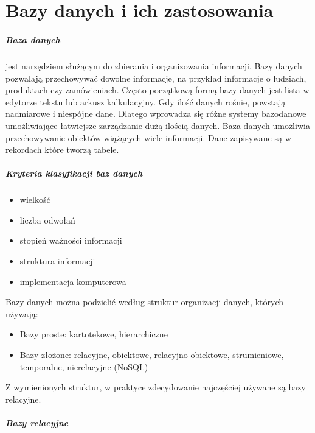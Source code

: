 \documentclass[]{report}
\begin{document}
\chapter{Bazy danych i ich zastosowania}

\paragraph{Baza danych} jest narzędziem służącym do zbierania i organizowania informacji. Bazy danych pozwalają przechowywać dowolne informacje, na przykład informacje o ludziach, produktach czy zamówieniach. Często początkową formą bazy danych jest lista w edytorze tekstu lub arkusz kalkulacyjny. Gdy ilość danych rośnie, powstają nadmiarowe i niespójne dane. Dlatego wprowadza się różne systemy bazodanowe umożliwiające łatwiejsze zarządzanie dużą ilością danych. Baza danych umożliwia przechowywanie obiektów wiążących wiele informacji. Dane zapisywane są w rekordach które tworzą tabele.

\medskip 

\paragraph{Kryteria klasyfikacji baz danych}

\begin{itemize}
\item wielkość
\item liczba odwołań
\item stopień ważności informacji
\item struktura informacji
\item implementacja komputerowa
\end{itemize}

Bazy danych można podzielić według struktur organizacji danych, których używają:

\begin{itemize}
\item Bazy proste: kartotekowe, hierarchiczne
\item Bazy złożone: relacyjne, obiektowe, relacyjno-obiektowe, strumieniowe, temporalne, nierelacyjne (NoSQL)
\end{itemize}

Z wymienionych struktur, w praktyce zdecydowanie najczęściej używane są bazy relacyjne.
\medskip


\paragraph{Bazy relacyjne}
\end{document}
